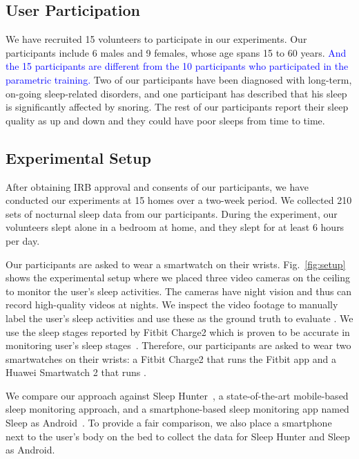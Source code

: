 \subsection{User Participation} We have recruited 15 volunteers to participate in our experiments. Our
participants include 6 males and 9 females, whose age spans 15 to 60 years. \textcolor{blue}{And the 15 participants are different from the 10 participants who participated in the parametric training.} Two of our participants have been diagnosed with long-term,
on-going sleep-related disorders, and one participant has described that his sleep is significantly affected by snoring. The rest of our
participants report their sleep quality as up and down and they could have poor sleeps from time to time.

\subsection{Experimental Setup}
After obtaining IRB approval and consents of our participants, we have conducted our experiments at 15 homes over a two-week period. We
collected 210 sets of nocturnal sleep data from our participants. During the experiment, our volunteers slept alone in a bedroom at
home, and they slept for at least 6 hours per day.


Our participants are asked to wear a smartwatch on their wrists. Fig.~\ref{fig:setup} shows the experimental setup where we placed three
video cameras on the ceiling to monitor the user's sleep activities. The cameras have night vision and thus can record high-quality videos
at nights.  We inspect the video footage to manually
label the user's sleep activities and use these as the ground truth to evaluate \systemname. We use the sleep stages reported by Fitbit
Charge2 which is proven to be accurate in monitoring user's sleep stages~\cite{evenson2015systematic}. Therefore, our participants are asked to wear two
smartwatches on their wrists: a Fitbit Charge2 that runs the Fitbit app and a Huawei Smartwatch 2 that runs \systemname.

We compare our approach against Sleep Hunter~\cite{gu2016sleep}, a state-of-the-art mobile-based sleep monitoring approach, and a
smartphone-based sleep monitoring app named Sleep as Android~\cite{SleepAndroid}. To provide a fair comparison, we also place a smartphone
next to the user's body on the bed to collect the data for Sleep Hunter and Sleep as Android.
